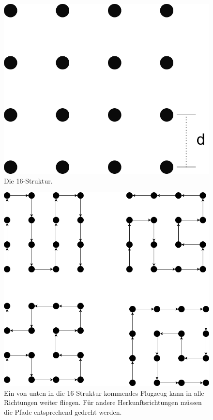 \documentclass[a4paper,10pt,ngerman]{scrartcl}
\begin{document}
\begin{figure}[t]
\includegraphics[scale=.2]{struktur}
\centering
\caption{Die 16-Struktur.}
\end{figure}
\begin{figure}[t]
\includegraphics[scale=0.5]{richtungen}
\centering
\caption{Ein von unten in die 16-Struktur kommendes Flugzeug kann in alle Richtungen weiter fliegen. Für andere Herkunftsrichtungen müssen die Pfade entsprechend gedreht werden.}
\end{figure}
\end{document}
